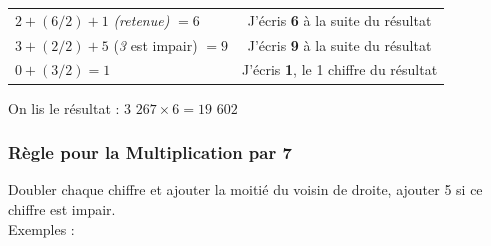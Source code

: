 \documentclass[a4paper]{article}
\begin{document}
\begin{small}
\begin{enumerate}
\begin{tabular}{l|c}
		$2 + (6/2) + 1$ \textit{(retenue)} $= 6$ & J'écris \textbf{6} à la suite du résultat
		
		\tabularnewline
		
		$3 + (2/2) + 5$ (\textit{3} est impair) $= 9$  & J'écris \textbf{9} à la suite du résultat
		
		\tabularnewline
		
		$0 + (3/2) = 1$ & J'écris \textbf{1}, le 1\up{er} chiffre du résultat
				
	\end{tabular}
	
	On lis le résultat : {\boldmath $3$ $267 \times 6 = 19$ $602$}\\	
	
\end{enumerate}
\end{small}

\vfill

\pagebreak





\subsubsection*{Règle pour la Multiplication par 7}

Doubler chaque chiffre et ajouter la moitié du voisin de droite, ajouter 5 si ce chiffre est impair.\\

{ \parindent=0.5cm Exemples : }
\end{document}
